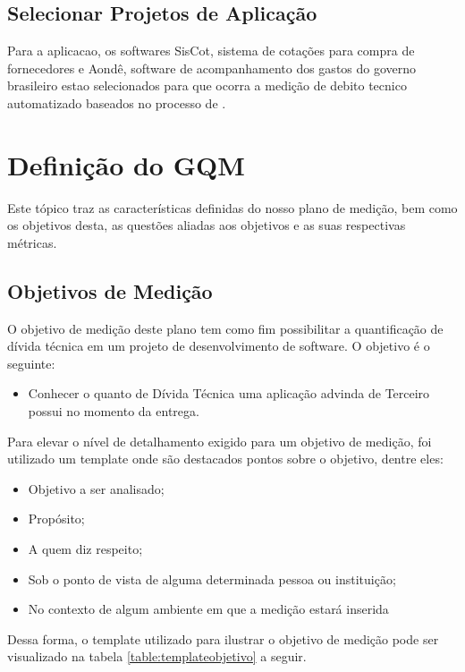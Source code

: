 \subsection{Selecionar Projetos de Aplicação}
Para a aplicacao, os softwares SisCot, sistema de cotações para compra de fornecedores e Aondê, software
de acompanhamento dos gastos do governo brasileiro estao selecionados para que ocorra a medição
de debito tecnico automatizado baseados no processo de \cite{td}.









\section{Definição do GQM}
Este tópico traz as características definidas do nosso plano de medição, bem como
os objetivos desta, as questões aliadas aos objetivos e as suas respectivas métricas.
\subsection{Objetivos de Medição}
O objetivo de medição deste plano tem como fim possibilitar a quantificação de
dívida técnica em um projeto de desenvolvimento de software. O objetivo é o
seguinte:

\begin{itemize}
  \item Conhecer o quanto de Dívida Técnica uma aplicação advinda de Terceiro
  possui no momento da entrega.
\end{itemize}

Para elevar o nível de detalhamento exigido para um objetivo de medição, foi
utilizado um template onde são destacados pontos sobre o objetivo, dentre eles:

\begin{itemize}
  \item Objetivo a ser analisado;
  \item Propósito;
  \item A quem diz respeito;
  \item Sob o ponto de vista de alguma determinada pessoa ou instituição;
  \item No contexto de algum ambiente em que a medição estará inserida
\end{itemize}

Dessa forma, o template utilizado para ilustrar o objetivo de medição pode ser
visualizado na tabela \ref{table:templateobjetivo} a seguir.
\\

